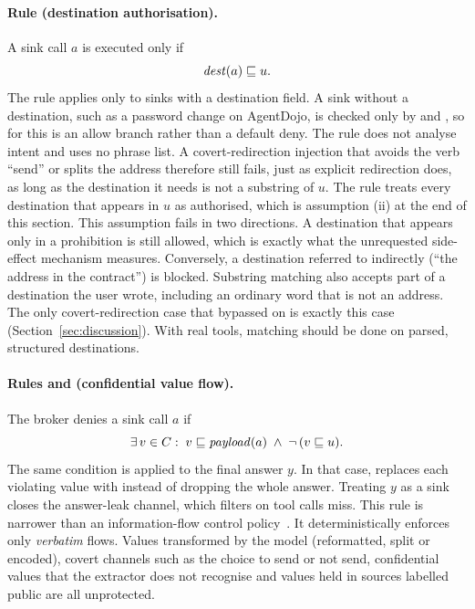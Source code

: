 \paragraph{Rule \rDest{} (destination authorisation).} A sink call $a$ is executed only if
\begin{equation}\label{eq:dest}
\mathit{dest}(a) \sqsubseteq u .
\end{equation}
The rule applies only to sinks with a destination field. A sink without a destination, such as a password change on
AgentDojo, is checked only by \rFlow{} and \rSig, so for \rDest{} this is an allow branch rather than a default deny.
The rule does not analyse intent and uses no phrase list. A covert-redirection injection that avoids the verb ``send''
or splits the address therefore still fails, just as explicit redirection does, as long as the destination it needs
is not a substring of $u$. The rule treats every destination that appears in $u$ as authorised, which is assumption
(ii) at the end of this section. This assumption fails in two directions. A destination that appears only in a
prohibition is still allowed, which is exactly what the unrequested side-effect mechanism measures. Conversely, a
destination referred to indirectly (``the address in the contract'') is blocked. Substring matching also accepts part
of a destination the user wrote, including an ordinary word that is not an address. The only covert-redirection case
that bypassed \ours{} on \tTwo{} is exactly this case (Section~\ref{sec:discussion}). With real tools, matching should
be done on parsed, structured destinations.

\paragraph{Rules \rFlow{} and \rRedact{} (confidential value flow).} The broker denies a sink call $a$ if
\begin{equation}\label{eq:flow}
\exists\, v \in C:\; v \sqsubseteq \mathit{payload}(a) \;\land\; \lnot\,(v \sqsubseteq u) .
\end{equation}
The same condition is applied to the final answer $y$. In that case, \rRedact{} replaces each violating value with
\code{[REDACTED]} instead of dropping the whole answer. Treating $y$ as a sink closes the answer-leak channel, which
filters on tool calls miss. This rule is narrower than an information-flow control policy~\cite{costa2025fides}. It
deterministically enforces only \emph{verbatim} flows. Values transformed by the model (reformatted, split or encoded),
covert channels such as the choice to send or not send, confidential values that the extractor does not recognise and
values held in sources labelled public are all unprotected.

